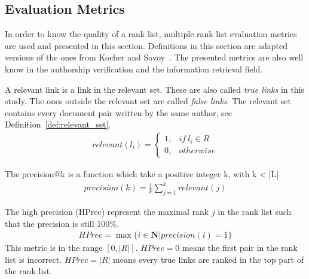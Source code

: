 \subsection{Evaluation Metrics \label{sec:rl_eval}}

In order to know the quality of a rank list, multiple rank list evaluation metrics are used and presented in this section.
Definitions in this section are adapted versions of the ones from Kocher and Savoy~\cite{kocher_linking}.
The presented metrics are also well know in the authorship verification and the information retrieval field.

\begin{definition}
  A relevant link is a link in the relevant set.
  These are also called \textit{true links} in this study.
  The ones outside the relevant set are called \textit{false links}.
  The relevant set contains every document pair written by the same author, see Definition~\ref{def:relevant_set}.
  \begin{gather*}
    relevant(l_i) =
    \begin{cases}
      1, & if\ l_i \in R \\
      0, & otherwise
    \end{cases}
  \end{gather*}

\end{definition}

\begin{definition}
  The precision@k is a function which take a positive integer k, with k < |L|
  \begin{gather*}
    precision(k) = \frac{1}{k} \sum_{j=1}^{k} relevant(j)
  \end{gather*}
\end{definition}

\begin{definition}
  The high precision (HPrec) represent the maximal rank $j$ in the rank list such that the precision is still 100\%.
  \begin{gather*}
    HPrec = \max\{i \in \mathbf{N} | precision(i) = 1\}
  \end{gather*}
  This metric is in the range $\left[0, |R|\right]$.
  $HPrec=0$ means the first pair in the rank list is incorrect.
  $HPrec=|R|$ means every true links are ranked in the top part of the rank list.
\end{definition}

